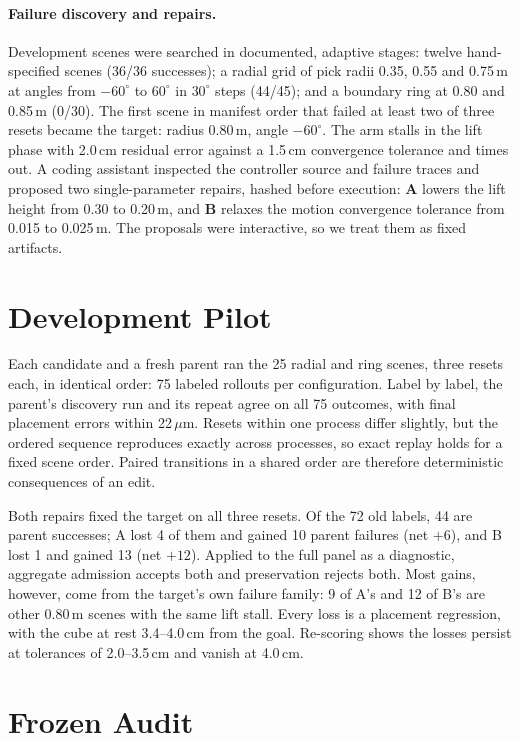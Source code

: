 \documentclass[letterpaper]{article} %
\begin{document}
\paragraph{Failure discovery and repairs.} Development scenes were searched in documented, adaptive stages: twelve hand-specified scenes (36/36 successes); a radial grid of pick radii 0.35, 0.55 and 0.75\,m at angles from $-60^\circ$ to $60^\circ$ in $30^\circ$ steps (44/45); and a boundary ring at 0.80 and 0.85\,m (0/30). The first scene in manifest order that failed at least two of three resets became the target: radius 0.80\,m, angle $-60^\circ$. The arm stalls in the lift phase with 2.0\,cm residual error against a 1.5\,cm convergence tolerance and times out. A coding assistant inspected the controller source and failure traces and proposed two single-parameter repairs, hashed before execution: \textbf{A} lowers the lift height from 0.30 to 0.20\,m, and \textbf{B} relaxes the motion convergence tolerance from 0.015 to 0.025\,m. The proposals were interactive, so we treat them as fixed artifacts.

\section{Development Pilot}
Each candidate and a fresh parent ran the 25 radial and ring scenes, three resets each, in identical order: 75 labeled rollouts per configuration. Label by label, the parent's discovery run and its repeat agree on all 75 outcomes, with final placement errors within 22\,$\mu$m. Resets within one process differ slightly, but the ordered sequence reproduces exactly across processes, so exact replay holds for a fixed scene order. Paired transitions in a shared order are therefore deterministic consequences of an edit.

Both repairs fixed the target on all three resets. Of the 72 old labels, 44 are parent successes; A lost 4 of them and gained 10 parent failures (net $+6$), and B lost 1 and gained 13 (net $+12$). Applied to the full panel as a diagnostic, aggregate admission accepts both and preservation rejects both. Most gains, however, come from the target's own failure family: 9 of A's and 12 of B's are other 0.80\,m scenes with the same lift stall. Every loss is a placement regression, with the cube at rest 3.4--4.0\,cm from the goal. Re-scoring shows the losses persist at tolerances of 2.0--3.5\,cm and vanish at 4.0\,cm.

\section{Frozen Audit}
\end{document}
